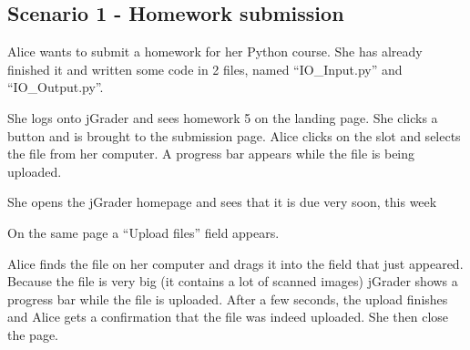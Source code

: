 \subsection{Scenario 1 - Homework submission}

Alice wants to submit a homework for her Python course. She has already finished it and written some code in 2 files, named ``IO\_Input.py'' and ``IO\_Output.py''.

She logs onto jGrader and sees homework 5 on the landing page. She clicks a button and is brought to the submission page. Alice clicks on the slot and selects the file from her computer. A progress bar appears while the file is being uploaded. 

She opens the jGrader homepage and sees that it is due very soon, this week

On the same page a ``Upload files'' field appears.

Alice finds the file on her computer and drags it into the field that just appeared. Because the file is very big (it contains a lot of scanned images) jGrader shows a progress bar while the file is uploaded. After a few seconds, the upload finishes and Alice gets a confirmation that the file was indeed uploaded. She then close the page.
